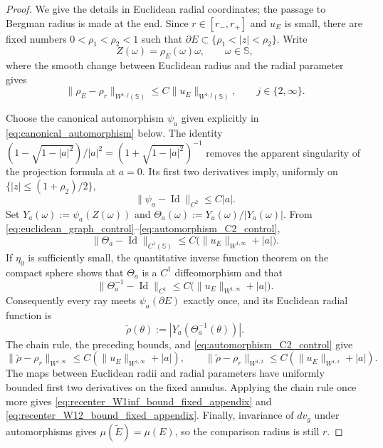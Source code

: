 \documentclass[11pt]{amsart}
\theoremstyle{plain}
\theoremstyle{definition}
\theoremstyle{remark}
\newcommand{\Sph}{\mathbb{S}}
\begin{document}
\begin{proof}
We give the details in Euclidean radial coordinates; the passage to Bergman
radius is made at the end. Since $r\in[r_-,r_+]$ and $u_E$ is small, there
are fixed numbers $0<\rho_1<\rho_2<1$ such that
$\partial E\subset\{\rho_1<|z|<\rho_2\}$. Write
\[
 Z(\omega)=\rho_E(\omega)\omega,
 \qquad \omega\in\Sph,
\]
where the smooth change between Euclidean radius and the radial parameter gives
\begin{equation}\label{eq:euclidean_graph_control}
 \|\rho_E-\rho_r\|_{W^{1,j}(\Sph)}
 \le C\|u_E\|_{W^{1,j}(\Sph)},\qquad j\in\{2,\infty\}.
\end{equation}

Choose the canonical automorphism $\psi_a$ given explicitly in
\eqref{eq:canonical_automorphism} below. The identity
$(1-\sqrt{1-|a|^2})/|a|^2=(1+\sqrt{1-|a|^2})^{-1}$ removes the apparent
singularity of the projection formula at $a=0$. Its first two derivatives imply,
uniformly on $\{|z|\le(1+\rho_2)/2\}$,
\begin{equation}\label{eq:automorphism_C2_control}
 \|\psi_a-\operatorname{Id}\|_{C^2}\le C|a|.
\end{equation}
Set $Y_a(\omega):=\psi_a(Z(\omega))$ and
$\Theta_a(\omega):=Y_a(\omega)/|Y_a(\omega)|$. From
\eqref{eq:euclidean_graph_control}--\eqref{eq:automorphism_C2_control},
\[
 \|\Theta_a-\operatorname{Id}\|_{C^1(\Sph)}
 \le C\bigl(\|u_E\|_{W^{1,\infty}}+|a|\bigr).
\]
If $\eta_0$ is sufficiently small, the quantitative inverse function theorem
on the compact sphere shows that $\Theta_a$ is a $C^1$ diffeomorphism and
that
\[
 \|\Theta_a^{-1}-\operatorname{Id}\|_{C^1}
 \le C\bigl(\|u_E\|_{W^{1,\infty}}+|a|\bigr).
\]
Consequently every ray meets $\psi_a(\partial E)$ exactly once, and its
Euclidean radial function is
\[
 \widetilde\rho(\theta)
 :=|Y_a(\Theta_a^{-1}(\theta))|.
\]
The chain rule, the preceding bounds, and
\eqref{eq:automorphism_C2_control} give
\[
 \|\widetilde\rho-\rho_r\|_{W^{1,\infty}}
 \le C(\|u_E\|_{W^{1,\infty}}+|a|),
 \qquad
 \|\widetilde\rho-\rho_r\|_{W^{1,2}}
 \le C(\|u_E\|_{W^{1,2}}+|a|).
\]
The maps between Euclidean radii and radial parameters have uniformly bounded first
two derivatives on the fixed annulus. Applying the chain rule once more gives
\eqref{eq:recenter_W1inf_bound_fixed_appendix} and
\eqref{eq:recenter_W12_bound_fixed_appendix}. Finally, invariance of $dv_g$
under automorphisms gives $\mu(\widetilde E)=\mu(E)$, so the comparison radius
is still $r$.
\end{proof}
\end{document}
